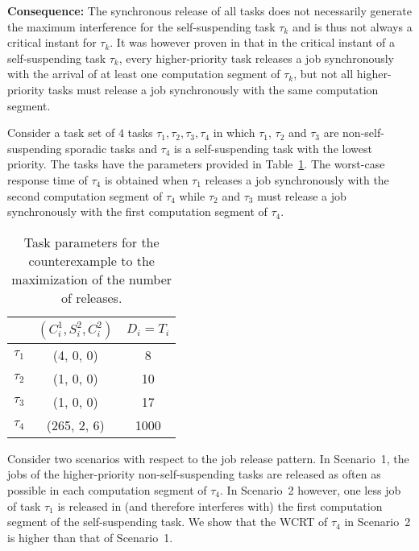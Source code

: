 {\bf Consequence:}  The synchronous release of all tasks does not necessarily generate the maximum interference for the self-suspending task $\tau_k$ and is thus not always a critical instant for $\tau_k$. 
It was however proven in \cite{ecrts15nelissen} that in the critical instant of a self-suspending task $\tau_k$, every higher-priority task releases a job synchronously with the arrival of at least one computation segment of $\tau_k$, but not all higher-priority tasks must release a job synchronously with the same computation segment.


Consider a task set of $4$ tasks $\tau_1, \tau_2, \tau_3, \tau_4$ in which $\tau_1$, $\tau_2$ and $\tau_3$ are non-self-suspending sporadic tasks and $\tau_4$ is a self-suspending task with the lowest priority. The tasks have the parameters provided in Table~\ref{table:ex-num-releases}. The worst-case response time of $\tau_4$ is obtained when $\tau_1$ releases a job synchronously with the second computation segment of $\tau_4$ while $\tau_2$ and $\tau_3$ must release a job synchronously with the first computation segment of $\tau_4$.

\begin{table}[t]
\centering
    \begin{tabular}{|c|c|c|}
 \hline
        & $(C_i^1, S_i^2, C_i^2)$ &  $D_i=T_i$\\ 
        \hline
        $\tau_1$ & (4, 0, 0) &  8\\ 
        $\tau_2$ &  (1, 0, 0) & 10 \\ 
        $\tau_3$ & (1, 0, 0) & 17 \\
        $\tau_4$ & (265, 2, 6) & 1000\\
        \hline
    \end{tabular} 
    \caption{Task parameters for the counterexample to the maximization of the number of releases.}
    \label{table:ex-num-releases}
\end{table}

Consider two scenarios with respect to the job release pattern. In Scenario~1, the jobs of the higher-priority non-self-suspending tasks are released as often as possible in each computation segment of $\tau_4$. In Scenario~2 however, one less job of task $\tau_1$ is released in (and therefore interferes with) the first computation segment of the self-suspending task. We show that the WCRT of $\tau_4$ in Scenario~2 is higher than that of Scenario~1. 

